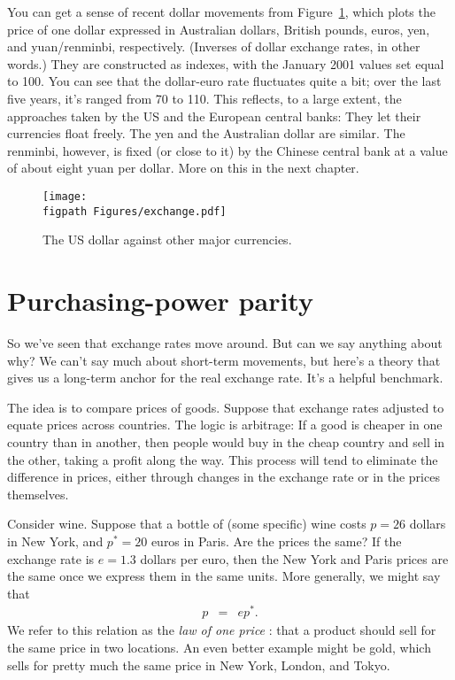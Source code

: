 You can get a sense of recent dollar movements from
Figure~\ref{fig:exch_rates},
which plots the price of one dollar expressed in Australian dollars,
British pounds, euros, yen, and yuan/renminbi, respectively.
(Inverses of dollar exchange rates, in other words.)
They are constructed as indexes, with the January 2001 values
set equal to 100.
You can see that the dollar-euro rate fluctuates quite a bit;
over the last five years, it's ranged from 70 to 110.
This reflects, to a large extent, the approaches taken by
the US and the European central banks:
They let their currencies float freely.
The yen and the Australian dollar
are similar.
The renminbi, however, is fixed (or close to it)
by the Chinese central bank  at a value of about eight yuan per dollar.
More on this in the next chapter.

%
\begin{figure}[h!]
    \caption{The US dollar against other major currencies.}
    \label{fig:exch_rates}
    \centering
    \texttt{[image: \\figpath Figures/exchange.pdf]}
\end{figure}
%


\section{Purchasing-power parity 
}

So we've seen that exchange rates move around.
But can we say anything about why?
We can't say much about short-term movements,
but here's a theory that gives us a long-term anchor
for the real exchange rate.
It's a helpful benchmark.

The idea is to compare prices of goods.
Suppose that exchange rates adjusted to equate prices across countries.
The logic is arbitrage:  If a good is cheaper in one
country than in another, then people would buy in the cheap country
and sell in the other, taking a profit along the way.
This process will tend to eliminate the difference in prices,
either through changes in the exchange rate or in the prices themselves.

Consider wine.
Suppose that a bottle of (some specific) wine costs $p=26$ dollars in New York,
and $p^*=20$ euros in Paris.
Are the prices the same?
If the exchange rate is $e=1.3$ dollars per euro,
then the New York and Paris prices are the same once we express them
in the same units.
More generally, we might say that
\begin{eqnarray*}
    p &=& e p^* .
\end{eqnarray*}
We refer to this relation as the {\it law of one price  \/}:
that a product should sell for the same price in two locations.
An even better example might be gold,
which sells for pretty much the same price in
New York, London, and Tokyo.

